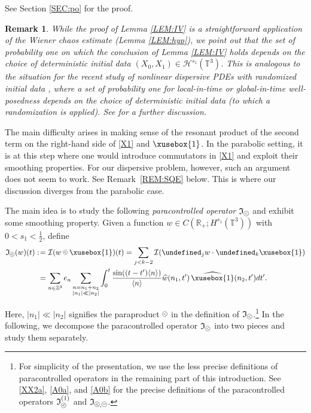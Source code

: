 \documentclass[%
11pt,  reqno]{amsart}
\def\<#1>{\xusebox{#1}}
\newcommand{\pe}{\mathbin{\scaleobj{0.7}{\tikz \draw (0,0) node[shape=circle,draw,inner sep=0pt,minimum size=8.5pt] {\scriptsize  $=$};}}}
\newcommand{\pl}{\mathbin{\scaleobj{0.7}{\tikz \draw (0,0) node[shape=circle,draw,inner sep=0pt,minimum size=8.5pt] {\scriptsize $<$};}}}
\newtheorem{remark}[theorem]{Remark}
\newcommand{\1}{\hspace{0.2mm}\text{I}\hspace{0.2mm}}
\newcommand{\noi}{\noindent}
\newcommand{\Z}{\mathbb{Z}}
\newcommand{\R}{\mathbb{R}}
\newcommand{\T}{\mathbb{T}}
\let\P= \undefined
\newcommand{\P}{\mathbf{P}}
\newcommand{\ft}{\widehat}
\newcommand{\jb}[1]
{\langle #1 \rangle}
\renewcommand{\H}{\mathcal{H}}
\newcommand{\I}{\mathcal{I}}
\newcommand{\If}{\mathfrak{I}}
\numberwithin{equation}{section}
\numberwithin{theorem}{section}
\begin{document}
See Section \ref{SEC:po} for the proof.

\begin{remark}\label{REM:IV}\rm
While the proof of Lemma \ref{LEM:IV}
is a straightforward application of the Wiener chaos estimate (Lemma \ref{LEM:hyp}), 
we point out that the set of probability one on which 
the conclusion of Lemma \ref{LEM:IV} holds depends
on the choice of deterministic initial data $(X_0, X_1) \in \H^{s_1}(\T^3)$.
This is analogous to the situation
for the recent study of
nonlinear dispersive PDEs
with randomized initial data \cite{BT1, BT3, LM, BOP2, POC, OP, OP2, BOP3},
where a set of probability one for local-in-time or global-in-time well-posedness
depends on the choice of deterministic initial data (to which a randomization is applied).
See \cite{BT3} for a further discussion.

\end{remark}




The main difficulty arises in making sense of 
the resonant product of the second term on the right-hand side of \eqref{X1}
and $\<1>$.
In the parabolic setting, 
it is at this step where
one would introduce commutators in \eqref{X1} and exploit their smoothing properties.
For our dispersive problem, however, such an argument does not seem to work.
See Remark~\ref{REM:SQE} below.
This is where our discussion  diverges from the parabolic case. 






The main idea is to study the following {\it paracontrolled operator} $\If_{\pl}$
 and exhibit some smoothing property.
Given a function $w \in C(\R_+; H^{s_1}(\T^3) )$ with $0 < s_1 < \frac 12$, define
\begin{align}
\begin{split}
 \If_{\pl}(w) (t)
:\! & =  \I (w\pl \<1>)(t) 
 = \sum_{j < k - 2} \I (\P_j w \cdot \P_k \<1>)\\
& =       \sum_{n \in \Z^3}
e_n  \sum_{\substack{n =  n_1 +  n_2\\  |n_1| \ll |n_2|}}
\int_0^t \frac{\sin ((t - t') \jb{n})}{\jb{n}} 
\ft w(n_1, t')\,  \ft{ \<1>}(n_2, t') dt'.
\end{split}
\label{X2}
\end{align}





\noi
Here, $|n_1| \ll |n_2|$ signifies the paraproduct $\pl$
in the definition of $\If_{\pl}$.\footnote{For simplicity of the presentation, 
we use the less precise definitions of paracontrolled operators
in the remaining part of this introduction.
See \eqref{XX2a}, \eqref{A0a},  and \eqref{A0b}
for the precise definitions of 
the paracontrolled operators $ \If_{\pl}^{(1)}$ 
and $\If_{\pl, \pe}$.}
In the following, we decompose the paracontrolled operator
$\If_{\pl}$ into two pieces
and study them separately.
\end{document}
